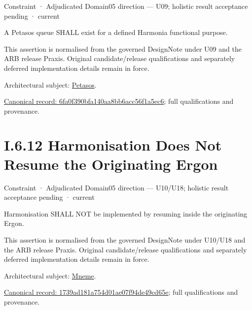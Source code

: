 \label{element:6fa0f390bfa140aa8bb6acc56f1a5ec6}
{\small Constraint · Adjudicated Domain05 direction — U09; holistic result acceptance pending · current}\par

A Petasos queue SHALL exist for a defined Harmonia functional purpose.



This assertion is normalised from the governed DesignNote under U09 and the ARB release Praxis. Original candidate/release qualifications and separately deferred implementation details remain in force.



Architectural subject: \hyperref[element:195e5f10db8e419391354197b5d7a8cc]{Petasos}.


{\footnotesize \href{../../../../../../../continuum/motivation/constraint/6fa0f390bfa140aa8bb6acc56f1a5ec6.md}{Canonical record: 6fa0f390bfa140aa8bb6acc56f1a5ec6}; full qualifications and provenance.}\par
\section*{I.6.12 Harmonisation Does Not Resume the Originating Ergon}
\label{navigation:I.6.12}

\label{element:1739ad181a754d01ae07f94de49cd65e}
{\small Constraint · Adjudicated Domain05 direction — U10/U18; holistic result acceptance pending · current}\par

Harmonisation SHALL NOT be implemented by resuming inside the originating Ergon.



This assertion is normalised from the governed DesignNote under U10/U18 and the ARB release Praxis. Original candidate/release qualifications and separately deferred implementation details remain in force.



Architectural subject: \hyperref[element:1af8a56358f7429fabfb57be66542a99]{Mneme}.


{\footnotesize \href{../../../../../../../continuum/motivation/constraint/1739ad181a754d01ae07f94de49cd65e.md}{Canonical record: 1739ad181a754d01ae07f94de49cd65e}; full qualifications and provenance.}\par

